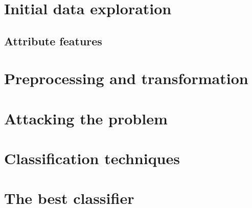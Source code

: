
\section{Initial data exploration}
\subsection{Attribute features}


\section{Preprocessing and transformation}

\section{Attacking the problem}

\section{Classification techniques}

\section{The best classifier}





